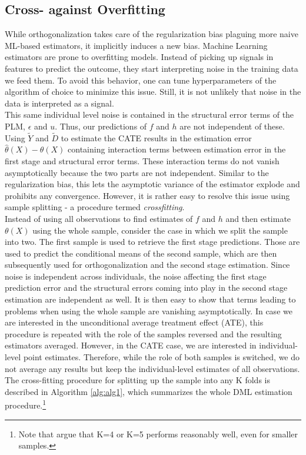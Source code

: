 \subsection{Cross- against Overfitting} \label{sec:cross-fitting}
While orthogonalization takes care of the regularization bias plaguing more naive ML-based estimators, it implicitly induces a new bias. Machine Learning estimators are prone to overfitting models. Instead of picking up signals in features to predict the outcome, they start interpreting noise in the training data we feed them. To avoid this behavior, one can tune hyperparameters of the algorithm of choice to minimize this issue. Still, it is not unlikely that noise in the data is interpreted as a signal. \\
This same individual level noise is contained in the structural error terms of the PLM, $\epsilon$ and $u$. Thus, our predictions of $f$ and $h$ are not independent of these. Using $\tilde{Y}$ and $\tilde{D}$ to estimate the CATE results in the estimation error $\hat{\theta}(X) - \theta(X)$ containing interaction terms between estimation error in the first stage and structural error terms. These interaction terms do not vanish asymptotically because the two parts are not independent. Similar to the regularization bias, this lets the asymptotic variance of the estimator explode and prohibits any convergence. However, it is rather easy to resolve this issue using sample splitting - a procedure termed \textit{crossfitting}. \\ 
Instead of using all observations to find estimates of $f$ and $h$ and then estimate $\theta(X)$ using the whole sample, consider the case in which we split the sample into two. The first sample is used to retrieve the first stage predictions. Those are used to predict the conditional means of the second sample, which are then subsequently used for orthogonalization and the second stage estimation. Since noise is independent across individuals, the noise affecting the first stage prediction error and the structural errors coming into play in the second stage estimation are independent as well. It is then easy to show that terms leading to problems when using the whole sample are vanishing asymptotically. In case we are interested in the unconditional average treatment effect (ATE), this procedure is repeated with the role of the samples reversed and the resulting estimators averaged. However, in the CATE case, we are interested in individual-level point estimates. Therefore, while the role of both samples is switched, we do not average any results but keep the individual-level estimates of all observations. The cross-fitting procedure for splitting up the sample into any K folds is described in Algorithm \ref{alg:alg1}, which summarizes the whole DML estimation procedure.\footnote{Note that \cite{DML2017} argue that K=4 or K=5 performs reasonably well, even for smaller samples.} 

